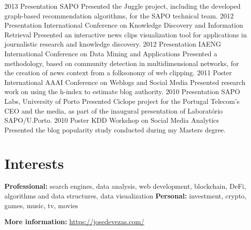 \documentclass{friggeri-cv}
\begin{document}
\begin{entrylist}
\entry
{2013}
{Presentation}
{SAPO}
{Presented the Juggle project, including the developed graph-based recommendation algorithms, for the SAPO
technical team.}
\entry
{2012}
{Presentation}
{International Conference on Knowledge Discovery and Information Retrieval}
{Presented an interactive news clips visualization tool for applications in journalistic research and knowledge discovery.}
\entry
{2012}
{Presentation}
{IAENG International Conference on Data Mining and Applications}
{Presented a methodology, based on community detection in multidimensional networks, for the creation of news context from a folksonomy of web clipping.}
\entry
{2011}
{Poster}
{International AAAI Conference on Weblogs and Social Media}
{Presented research work on using the h-index to estimate blog authority.}
\entry
{2010}
{Presentation}
{SAPO Labs, University of Porto}
{Presented Ciclope project for the Portugal Telecom's CEO and the media, as part of the inaugural presentation of
Laboratório SAPO/U.Porto.}
\entry
{2010}
{Poster}
{KDD Workshop on Social Media Analytics}
{Presented the blog popularity study conducted during my Masters degree.}
\end{entrylist}


\section{Interests}

\textbf{Professional:} search engines, data analysis, web development, blockchain, DeFi, algorithms and data structures, data visualization \textbf{Personal:} investment, crypto, games, music, tv, movies

\textbf{More information:} \url{https://josedevezas.com/}

\end{document}
